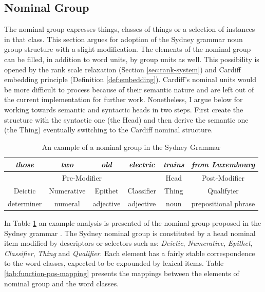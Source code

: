 


\subsection{Nominal Group}
\label{sec:nominal-group}

The nominal group expresses things, classes of things or a selection of instances in that class. This section argues for adoption of the Sydney grammar noun group structure with a slight modification. The elements of the nominal group can be filled, in addition to word units, by group units as well. This possibility is opened by the rank scale relaxation (Section \ref{sec:rank-system}) and Cardiff embedding principle (Definition \ref{def:embedding}). Cardiff's nominal units would be more difficult to process because of their semantic nature and are left out of the current implementation for further work. Nonetheless, I argue below for working towards semantic and syntactic heads in two steps. First create the structure with the syntactic one (the Head) and then derive the semantic one (the Thing) eventually switching to the Cardiff nominal structure.

\begin{table}[!ht]
    \centering
	\begin{tabular}{|c|c|c|c|c|c|}
		\hline
		\textit{those} & \textit{two} & \textit{old} & \textit{electric} & \textit{trains} & \textit{from Luxembourg} \\ \hline
		\multicolumn{4}{|c|}{Pre-Modifier}                               & Head            & Post-Modifier            \\ \hline
		Deictic        & Numerative   & Epithet      & Classifier        & Thing           & Qualifyier               \\ \hline
		determiner     & numeral      & adjective    & adjective         & noun            & prepositional phrase     \\ \hline
	\end{tabular}
	\caption{An example of a nominal group in the Sydney Grammar \citep[264]{Halliday2013}}
	\label{tab:example-ng}
\end{table}

In  Table \ref{tab:example-ng} an example analysis is presented of the nominal group proposed in the Sydney grammar \citep[364--369]{Halliday2013}. The Sydney nominal group is constituted by a head nominal item modified by descriptors or selectors such as: \textit{Deictic}, \textit{Numerative}, \textit{Epithet}, \textit{Classifier}, \textit{Thing} and \textit{Qualifier}. Each element has a fairly stable correspondence to the word classes, expected to be expounded by lexical items. Table \ref{tab:function-pos-mapping} presents the mappings between the elements of nominal group and the word classes. 

